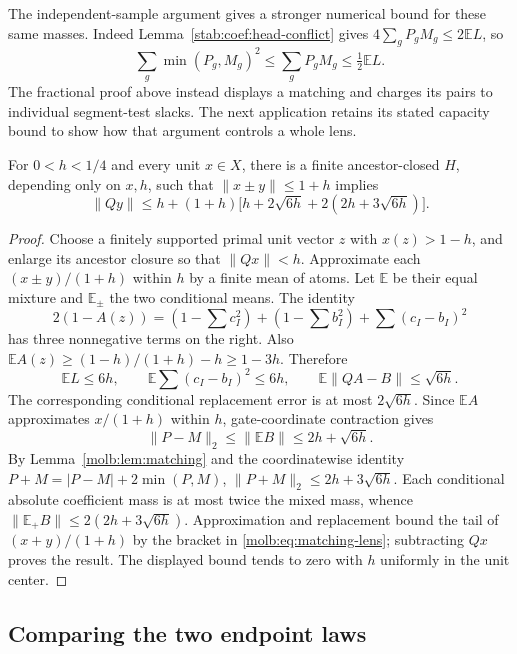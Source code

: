 The independent-sample argument gives a stronger numerical bound for
these same masses. Indeed Lemma~\ref{stab:coef:head-conflict} gives
$4\sum_gP_gM_g\le2\mathbb EL$, so
\[
 \sum_g\min(P_g,M_g)^2\le\sum_gP_gM_g\le\tfrac12\mathbb EL.
\]
The fractional proof above instead displays a matching and charges
its pairs to individual segment-test slacks. The next application
retains its stated capacity bound to show how that argument controls
a whole lens.

\begin{proposition}\label{molb:prop:matching-lens}
For \(0<h<1/4\) and every unit \(x\in X\), there is a finite
ancestor-closed \(H\), depending only on \(x,h\), such that
\(\|x\pm y\|\le1+h\) implies
\begin{equation}\label{molb:eq:matching-lens}
 \|Qy\|\le h+(1+h)
  \bigl[h+2\sqrt{6h}+2(2h+3\sqrt{6h})\bigr].
\end{equation}
\end{proposition}

\begin{proof}
Choose a finitely supported primal unit vector \(z\) with
\(x(z)>1-h\), and enlarge its ancestor closure so that \(\|Qx\|<h\).
Approximate each \((x\pm y)/(1+h)\) within \(h\) by a finite mean of
atoms.  Let \(\mathbb E\) be their equal mixture and
\(\mathbb E_\pm\) the two conditional means.  The identity
\[
 2(1-A(z))=(1-\sum c_I^2)+(1-\sum b_I^2)+\sum(c_I-b_I)^2
\]
has three nonnegative terms on the right.  Also
\(\mathbb EA(z)\ge(1-h)/(1+h)-h\ge1-3h\).  Therefore
\[
 \mathbb EL\le6h,\qquad
 \mathbb E\sum(c_I-b_I)^2\le6h,\qquad
 \mathbb E\|QA-B\|\le\sqrt{6h}.
\]
The corresponding conditional replacement error is at most
\(2\sqrt{6h}\).  Since \(\mathbb EA\) approximates \(x/(1+h)\)
within \(h\), gate-coordinate contraction gives
\[
 \|P-M\|_2\le\|\mathbb EB\|\le2h+\sqrt{6h}.
\]
By Lemma~\ref{molb:lem:matching} and the coordinatewise identity
\(P+M=|P-M|+2\min(P,M)\),
\(\|P+M\|_2\le2h+3\sqrt{6h}\).
Each conditional absolute coefficient mass is at most twice the mixed
mass, whence
\(\|\mathbb E_+B\|\le2(2h+3\sqrt{6h})\).
Approximation and replacement bound the tail of \((x+y)/(1+h)\) by
the bracket in \eqref{molb:eq:matching-lens}; subtracting \(Qx\)
proves the result.  The displayed bound tends to zero with \(h\)
uniformly in the unit center.
\end{proof}

\subsection{Comparing the two endpoint laws}
\label{molx:separate-laws}

